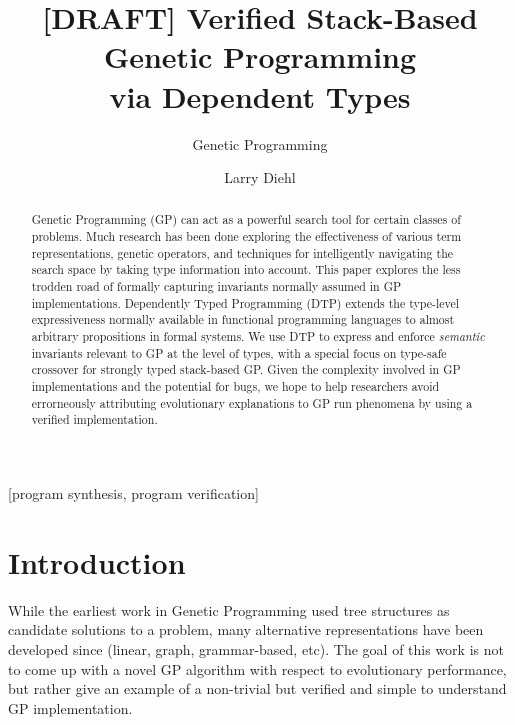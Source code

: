 \documentclass{acm_proc_article-sp}
\begin{document}
\title{[DRAFT] Verified Stack-Based Genetic Programming\\
via Dependent Types}

\subtitle{Genetic Programming}

\author{
\alignauthor Larry Diehl\\
}

\maketitle
\begin{abstract}
Genetic Programming (GP) can act as a powerful search tool for certain
classes of problems. Much research has been done exploring the
effectiveness of  various term representations, genetic operators, and
techniques for intelligently navigating the search space by taking
type information into account. This paper explores the less trodden
road of formally capturing invariants normally assumed in GP
implementations. Dependently Typed Programming (DTP) extends the
type-level expressiveness normally available in functional programming
languages to almost arbitrary propositions in formal systems. We use
DTP to express and enforce \textit{semantic} invariants relevant to GP
at the level of types, with a special focus on type-safe crossover for
strongly typed stack-based GP. Given the complexity involved in GP
implementations and the potential for bugs, we hope to help
researchers avoid errorneously attributing evolutionary explanations
to GP run phenomena by using a verified implementation. 
\end{abstract}

[program synthesis, program verification]



\section{Introduction}

While the earliest work in Genetic Programming used tree structures as
candidate solutions to a problem, many alternative representations
have been developed since (linear, graph, grammar-based, etc). The
goal of this work is not to come up with a novel GP algorithm with
respect to evolutionary performance, but rather give an example of a
non-trivial but verified and simple to understand GP implementation.
\end{document}
